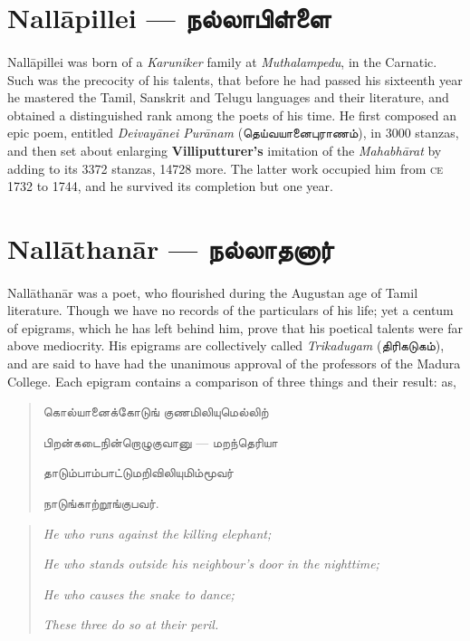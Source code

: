 \documentclass{article}
\newcommand{\TamilText}[1]{\texttamil{#1}}
\newcommand{\TamilBold}[1]{\texttamil{\textbf{#1}}}
\newcommand{\tam}[1]{\TamilText{#1}}
\newcommand{\tambold}[1]{\TamilBold{#1}}
\begin{document}
\section{Nall\={a}pillei --- \tambold{நல்லாபிள்ளை}}
\paragraph{}
Nall\={a}pillei was born of a \emph{Karuniker} family at \emph{Muthalampedu}, in the Carnatic. Such was the precocity of his talents, that before he had passed his sixteenth year he mastered the Tamil, Sanskrit and Telugu languages and their literature, and obtained a distinguished rank among the poets of his time. He first composed an epic poem, entitled \emph{Deivay\={a}nei Pur\={a}nam} (\tam{தெய்வயானைபுராணம்}), in 3000 stanzas, and then set about enlarging \textbf{Villiputturer's} imitation of the \emph{Mahabh\={a}rat} by adding to its 3372 stanzas, 14728 more. The latter work occupied him from \textsc{ce} 1732 to 1744, and he survived its completion but one year.

\section{Nall\={a}than\={a}r --- \tambold{நல்லாதனார்}}
\paragraph{}
Nall\={a}than\={a}r was a poet, who flourished during the Augustan age of Tamil literature. Though we have no records of the particulars of his life; yet a centum of epigrams, which he has left behind him, prove that his poetical talents were far above mediocrity. His epigrams are collectively called \emph{Trikadugam} (\tam{திரிகடுகம்}), and are said to have had the unanimous approval of the professors of the Madura College. Each epigram contains a comparison of three things and their result: as,
\begin{quotation}\small
\tam{கொல்யானைக்கோடுங்‌ குணமிலியுமெல்லிற்}

\tam{பிறன்கடைநின்றொழுகுவானு} --- \tam{மறந்தெரியா}

\tam{தாடும்பாம்பாட்டுமறிவிலியுமிம்மூவர்‌}

\tam{நாடுங்காற்றூங்குபவர்‌}.
\end{quotation}
\begin{quotation}\small
\emph{He who runs against the killing elephant;}

\emph{He who stands outside his neighbour's door in the nighttime;}

\emph{He who causes the snake to dance;}

\emph{These three do so at their peril.}
\end{quotation}
\end{document}
